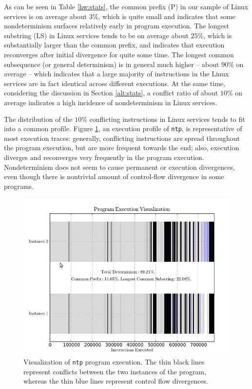 As can be seen in Table \ref{hw:stats}, the common prefix (P) 
in our sample of Linux services is on average about $3\%$,
which is quite small and indicates that some
nondeterminism surfaces relatively early in program execution. 
The longest substring (LS) in
Linux services tends to be on average about $25\%$,
which is substantially larger than the common prefix,
and indicates that execution reconverges after
initial divergence for quite some time.
The longest common subsequence (or general determinism)
is in general much higher -- about $90\%$ on average -- 
which indicates that a large majority of instructions 
in the Linux services are in fact identical across
different executions. At the same time,
considering the discussion in Section \ref{alt:stats},
a conflict ratio of about $10\%$ on average
indicates a high incidence of nondeterminism 
in Linux services.  

The distribution of the $10\%$ conflicting instructions
in Linux services tends to fit into a common profile.
Figure \ref{ntp:tracech2}, an execution profile of \texttt{ntp}, is representative
of most execution traces: generally,
conflicting instructions are spread throughout
the program execution, but are more frequent
towards the end; also, execution diverges
and reconverges very frequently in the program
execution. Nondeterminism does not seem to cause permanent or
execution divergences, even though there is nontrivial amount
of control-flow divergence in some programs.

\begin{figure}[h]
  \center
  \includegraphics[trim=0cm 0cm 0cm 0cm, scale=0.6]{ntptracech2.jpg}
  \caption[Visualization of \texttt{ntp} program execution]%
          {Visualization of \texttt{ntp} program execution.
          The thin black lines represent conflicts between
          the two instances of the program, whereas
          the thin blue lines represent control flow
          divergences.}
  \label{ntp:tracech2}
\end{figure} 


